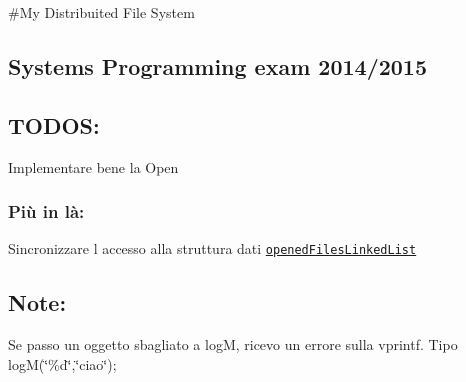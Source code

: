 \#\+My Distribuited File System \subsection*{Systems Programming exam 2014/2015}

\subsection*{T\+O\+D\+O\+S\+:}


\begin{DoxyItemize}
\item Implementare bene la Open
\end{DoxyItemize}

\subsubsection*{Più in là\+:}


\begin{DoxyItemize}
\item Sincronizzare l\textquotesingle{} accesso alla struttura dati \href{file:///home/federicoponzi/Progetto/html/server_8c.html#a3063a74baee4fe1870e52d0ec577afa9}{\tt opened\+Files\+Linked\+List}
\end{DoxyItemize}

\subsection*{Note\+:}


\begin{DoxyItemize}
\item Se passo un oggetto sbagliato a log\+M, ricevo un errore sulla vprintf. Tipo log\+M(\char`\"{}\%d\char`\"{},\char`\"{}ciao\char`\"{}); 
\end{DoxyItemize}